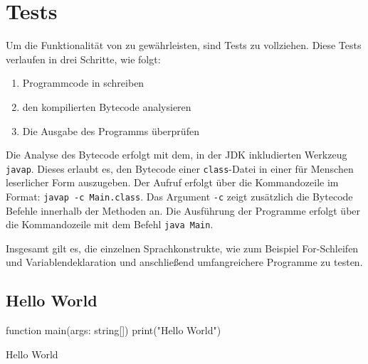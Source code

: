 \chapter{Tests}
\label{cha:tests}

Um die Funktionalität von \toya zu gewährleisten, sind Tests zu vollziehen. Diese Tests verlaufen in drei Schritte, wie folgt:
\begin{enumerate}
    \item Programmcode in \toya schreiben
    \item den kompilierten Bytecode analysieren
    \item Die Ausgabe des Programms überprüfen
\end{enumerate}

Die Analyse des Bytecode erfolgt mit dem, in der JDK inkludierten Werkzeug \texttt{javap}. Dieses erlaubt es, den Bytecode einer \texttt{class}-Datei in einer für Menschen leserlicher Form auszugeben. Der Aufruf erfolgt über die Kommandozeile im Format: \texttt{javap -c Main.class}. Das Argument \texttt{-c} zeigt zusätzlich die Bytecode Befehle innerhalb der Methoden an. Die Ausführung der Programme erfolgt über die Kommandozeile mit dem Befehl \texttt{java Main}.

Insgesamt gilt es, die einzelnen Sprachkonstrukte, wie zum Beispiel For-Schleifen und Variablendeklaration und anschließend umfangreichere Programme zu testen.

\section{Hello World}

\begin{ToyaCode}[numbers=none, caption={Quelltext des Hello World Programms}]
function main(args: string[]) {
    print("Hello World")
}
\end{ToyaCode}


\begin{ToyaCode}[numbers=none, caption={Konsolen-Ausgabe des Hello World Programms}]
Hello World    
\end{ToyaCode}


